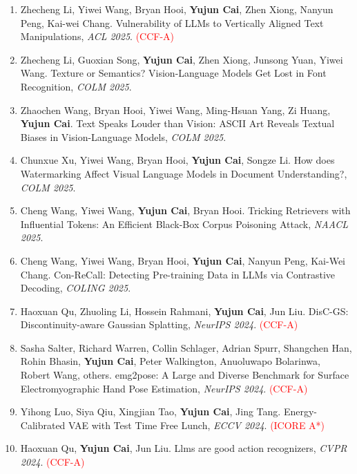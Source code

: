\documentclass[UTF8,a4paper,11pt,fontset=fandol]{ctexart}
\begin{document}
\begin{enumerate}
\item Zhecheng Li, Yiwei Wang, Bryan Hooi, \textbf{Yujun Cai}, Zhen Xiong, Nanyun Peng, Kai-wei Chang. Vulnerability of LLMs to Vertically Aligned Text Manipulations, \textit{ACL 2025}. \textcolor{red}{(CCF-A)}

\item Zhecheng Li, Guoxian Song, \textbf{Yujun Cai}, Zhen Xiong, Junsong Yuan, Yiwei Wang. Texture or Semantics? Vision-Language Models Get Lost in Font Recognition, \textit{COLM 2025}.

\item Zhaochen Wang, Bryan Hooi, Yiwei Wang, Ming-Hsuan Yang, Zi Huang, \textbf{Yujun Cai}. Text Speaks Louder than Vision: ASCII Art Reveals Textual Biases in Vision-Language Models, \textit{COLM 2025}.

\item Chunxue Xu, Yiwei Wang, Bryan Hooi, \textbf{Yujun Cai}, Songze Li. How does Watermarking Affect Visual Language Models in Document Understanding?, \textit{COLM 2025}.

\item Cheng Wang, Yiwei Wang, \textbf{Yujun Cai}, Bryan Hooi. Tricking Retrievers with Influential Tokens: An Efficient Black-Box Corpus Poisoning Attack, \textit{NAACL 2025}.

\item Cheng Wang, Yiwei Wang, Bryan Hooi, \textbf{Yujun Cai}, Nanyun Peng, Kai-Wei Chang. Con-ReCall: Detecting Pre-training Data in LLMs via Contrastive Decoding, \textit{COLING 2025}.

\item Haoxuan Qu, Zhuoling Li, Hossein Rahmani, \textbf{Yujun Cai}, Jun Liu. DisC-GS: Discontinuity-aware Gaussian Splatting, \textit{NeurIPS 2024}. \textcolor{red}{(CCF-A)}

\item Sasha Salter, Richard Warren, Collin Schlager, Adrian Spurr, Shangchen Han, Rohin Bhasin, \textbf{Yujun Cai}, Peter Walkington, Anuoluwapo Bolarinwa, Robert Wang, others. emg2pose: A Large and Diverse Benchmark for Surface Electromyographic Hand Pose Estimation, \textit{NeurIPS 2024}. \textcolor{red}{(CCF-A)}

\item Yihong Luo, Siya Qiu, Xingjian Tao, \textbf{Yujun Cai}, Jing Tang. Energy-Calibrated VAE with Test Time Free Lunch, \textit{ECCV 2024}. \textcolor{red}{(ICORE A*)}

\item Haoxuan Qu, \textbf{Yujun Cai}, Jun Liu. Llms are good action recognizers, \textit{CVPR 2024}. \textcolor{red}{(CCF-A)}


\end{enumerate}
\end{document}
